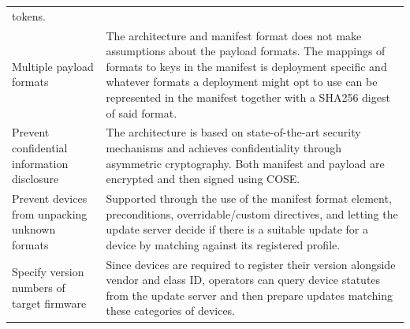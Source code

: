 \documentclass[0-thesis.tex]{subfiles}
\begin{document}
\begin{longtable}[]{@{}ll@{}}
\begin{minipage}[t]{0.53\columnwidth}
    tokens.\strut
    \end{minipage}\tabularnewline
    \begin{minipage}[t]{0.41\columnwidth}\raggedright\strut
    Multiple payload formats\strut
    \end{minipage} & \begin{minipage}[t]{0.53\columnwidth}\raggedright\strut
    The architecture and manifest format does not make assumptions about the
    payload formats. The mappings of formats to keys in the manifest is
    deployment specific and whatever formats a deployment might opt to use
    can be represented in the manifest together with a SHA256 digest of said
    format.\strut
    \end{minipage}\tabularnewline
    \begin{minipage}[t]{0.41\columnwidth}\raggedright\strut
    Prevent confidential information disclosure\strut
    \end{minipage} & \begin{minipage}[t]{0.53\columnwidth}\raggedright\strut
    The architecture is based on state-of-the-art security mechanisms and
    achieves confidentiality through asymmetric cryptography. Both manifest
    and payload are encrypted and then signed using COSE.\strut
    \end{minipage}\tabularnewline
    \begin{minipage}[t]{0.41\columnwidth}\raggedright\strut
    Prevent devices from unpacking unknown formats\strut
    \end{minipage} & \begin{minipage}[t]{0.53\columnwidth}\raggedright\strut
    Supported through the use of the manifest format element, preconditions,
    overridable/custom directives, and letting the update server decide if
    there is a suitable update for a device by matching against its
    registered profile.\strut
    \end{minipage}\tabularnewline
    \begin{minipage}[t]{0.41\columnwidth}\raggedright\strut
    Specify version numbers of target firmware\strut
    \end{minipage} & \begin{minipage}[t]{0.53\columnwidth}\raggedright\strut
    Since devices are required to register their version alongside vendor
    and class ID, operators can query device statutes from the update server
    and then prepare updates matching these categories of devices.\strut
    \end{minipage}\tabularnewline

\end{longtable}
\end{document}
